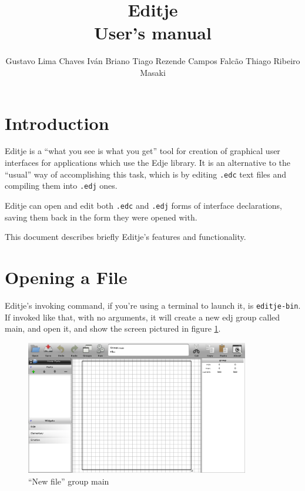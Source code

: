 \documentclass[a4paper]{profusion}
\title{Editje\\
  \normalsize{User's manual}}
\author{Gustavo Lima Chaves \hspace{1cm} Iván Briano \hspace{1cm}
  Tiago Rezende Campos Falcão \newline Thiago Ribeiro Masaki}
\begin{document}
\maketitle
\tableofcontents
\listoffigures

\section{Introduction}

Editje is a ``what you see is what you get'' tool for creation of
graphical user interfaces for applications which use the Edje
library. It is an alternative to the ``usual'' way of accomplishing
this task, which is by editing \texttt{.edc} text files and compiling
them into \texttt{.edj} ones.

Editje can open and edit both \texttt{.edc} and \texttt{.edj} forms of
interface declarations, saving them back in the form they were opened
with.

This document describes briefly Editje's features and functionality.

\section{Opening a File}

Editje's invoking command, if you're using a terminal to launch it, is
\texttt{editje-bin}. If invoked like that, with no arguments, it will
create a new edj group called main, and open it, and show the screen
pictured in figure \ref{fig:new_file}.

\begin{figure}[h!]
  \centering
  \includegraphics[width=0.87\textwidth]{images/new_file.png}
  \caption{``New file'' group main}
  \label{fig:new_file}
\end{figure}
\end{document}
